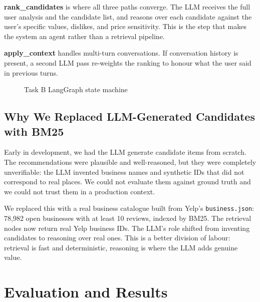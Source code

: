 \documentclass[11pt,a4paper]{article}
\begin{document}
\textbf{rank\_candidates} is where all three paths converge. The LLM
receives the full user analysis and the candidate list, and reasons over
each candidate against the user's specific values, dislikes, and price
sensitivity. This is the step that makes the system an agent rather than a
retrieval pipeline.

\textbf{apply\_context} handles multi-turn conversations. If conversation
history is present, a second LLM pass re-weights the ranking to honour
what the user said in previous turns.

\begin{figure}[h]
\centering
\caption{Task B LangGraph state machine}
\label{fig:task_b}
\end{figure}

\subsection{Why We Replaced LLM-Generated Candidates with BM25}

Early in development, we had the LLM generate candidate items from scratch.
The recommendations were plausible and well-reasoned, but they were
completely unverifiable: the LLM invented business names and synthetic IDs
that did not correspond to real places. We could not evaluate them against
ground truth and we could not trust them in a production context.

We replaced this with a real business catalogue built from Yelp's
\texttt{business.json}: 78,982 open businesses with at least 10 reviews,
indexed by BM25. The retrieval nodes now return real Yelp business IDs.
The LLM's role shifted from inventing candidates to reasoning over real
ones. This is a better division of labour: retrieval is fast and
deterministic, reasoning is where the LLM adds genuine value.

\section{Evaluation and Results}
\end{document}
